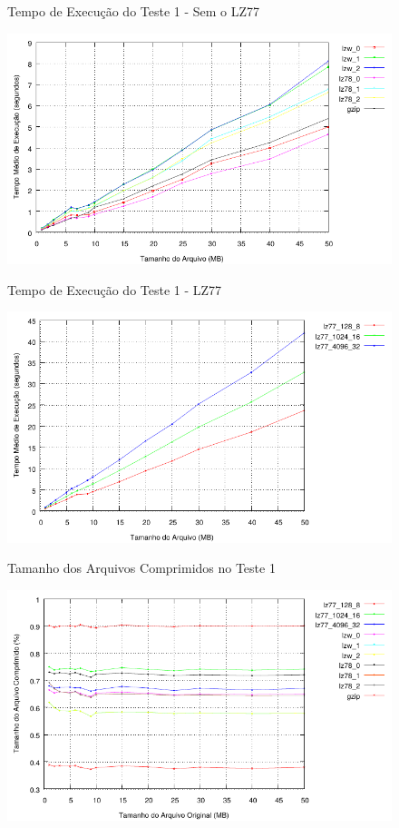 \documentclass[]{article}
\begin{document}
\begin{figure}
	{\centering Tempo de Execução do Teste 1 - Sem o LZ77\par}
	\includegraphics{images/natural_tempo_sem_lz77}
\caption{}
\label{fig:e1}
\end{figure}

\begin{figure}
	{\centering Tempo de Execução do Teste 1 - LZ77\par}
	\includegraphics{images/natural_tempo_com_lz77}
\caption{}
\label{fig:e2}
\end{figure}

\begin{figure}
	{\centering Tamanho dos Arquivos Comprimidos no Teste 1\par}
	\includegraphics{images/natural_taxa}
\caption{}
\label{fig:e3}
\end{figure}
\end{document}
